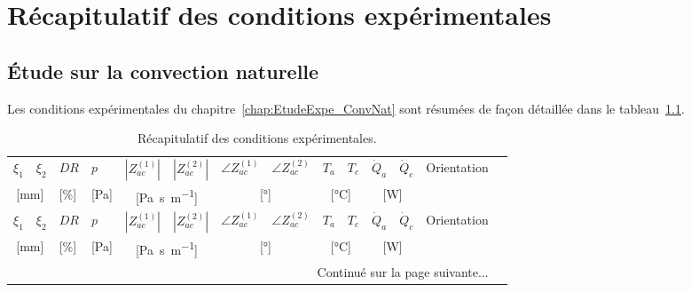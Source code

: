 \chapter{Récapitulatif des conditions expérimentales}
\section{\'Etude sur la convection naturelle}
Les conditions expérimentales du chapitre~\ref{chap:EtudeExpe_ConvNat} sont résumées de façon détaillée dans le tableau~\ref{tab:RecapCondExpe}.

\begin{longtable}{llll llll llll ll}
	\caption{Récapitulatif des conditions expérimentales.}
	\label{tab:RecapCondExpe}\\%
	
	\hline
	$\xi_1$ & $\xi_2$  & $DR$ & $p$ & $|Z_{ac}^{(1)}|$ & $|Z_{ac}^{(2)}|$& $\angle Z_{ac}^{(1)}$  & $\angle Z_{ac}^{(2)}$ & $T_a$  & $T_c$ & $\dot Q_a$ & $\dot Q_c$  & \multirow{2}{*}{Orientation} \\%
	
	\multicolumn{2}{c}{[\unit{\milli\meter}]} & [\unit{\percent}] & [\unit{\pascal}] & \multicolumn{2}{c}{[\unit{\pascal\second\per\meter}]} & \multicolumn{2}{c}{[\unit{\degree}]}  & \multicolumn{2}{c}{[\unit{\degreeCelsius}]} &\multicolumn{2}{c}{[\unit{\watt}]} &  \\\hline\hline \endfirsthead
	
	\hline
	$\xi_1$ & $\xi_2$  & $DR$ & $p$ & $|Z_{ac}^{(1)}|$ & $|Z_{ac}^{(2)}|$& $\angle Z_{ac}^{(1)}$  & $\angle Z_{ac}^{(2)}$ & $T_a$  & $T_c$ & $\dot Q_a$ & $\dot Q_c$  & \multirow{2}{*}{Orientation} \\%
	
	\multicolumn{2}{c}{[\unit{\milli\meter}]} & [\unit{\percent}] & [\unit{\pascal}] & \multicolumn{2}{c}{[\unit{\pascal\second\per\meter}]} & \multicolumn{2}{c}{[\unit{\degree}]}  & \multicolumn{2}{c}{[\unit{\degreeCelsius}]} &\multicolumn{2}{c}{[\unit{\watt}]} &  \\\hline\hline \endhead
	
	\hline
	\multicolumn{13}{r}{Continué sur la page suivante...} \endfoot
    \hline \endlastfoot
	

\end{longtable}
